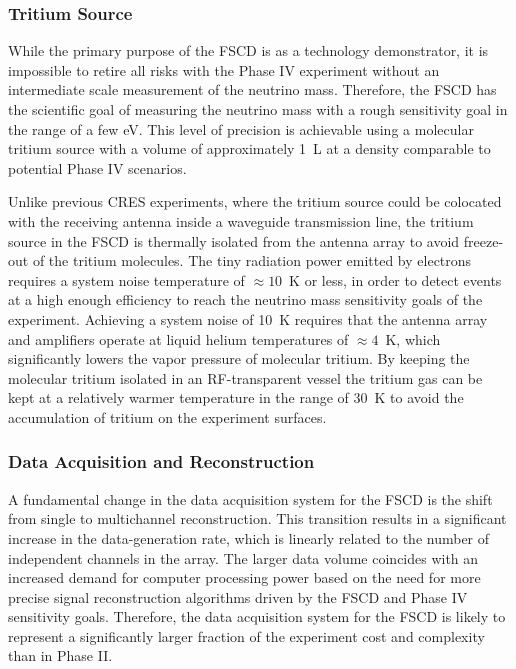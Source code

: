 \subsubsection*{Tritium Source}

While the primary purpose of the FSCD is as a technology demonstrator, it is impossible to retire all risks with the Phase IV experiment without an intermediate scale measurement of the neutrino mass. Therefore, the FSCD has the scientific goal of measuring the neutrino mass with a rough sensitivity goal in the range of a few eV. This level of precision is achievable using a molecular tritium source with a volume of approximately 1~L at a density comparable to potential Phase IV scenarios.

Unlike previous CRES experiments, where the tritium source could be colocated with the receiving antenna inside a waveguide transmission line, the tritium source in the FSCD is thermally isolated from the antenna array to avoid freeze-out of the tritium molecules. The tiny radiation power emitted by electrons requires a system noise temperature of $\approx 10$~K or less, in order to detect events at a high enough efficiency to reach the neutrino mass sensitivity goals of the experiment. Achieving a system noise of 10~K requires that the antenna array and amplifiers operate at liquid helium temperatures of $\approx 4$~K, which significantly lowers the vapor pressure of molecular tritium. By keeping the molecular tritium isolated in an RF-transparent vessel the tritium gas can be kept at a relatively warmer temperature in the range of 30~K to avoid the accumulation of tritium on the experiment surfaces. 

\subsubsection*{Data Acquisition and Reconstruction}

A fundamental change in the data acquisition system for the FSCD is the shift from single to multichannel reconstruction. This transition results in a significant increase in the data-generation rate, which is linearly related to the number of independent channels in the array. The larger data volume coincides with an increased demand for computer processing power based on the need for more precise signal reconstruction algorithms driven by the FSCD and Phase IV sensitivity goals. Therefore, the data acquisition system for the FSCD is likely to represent a significantly larger fraction of the experiment cost and complexity than in Phase II.

